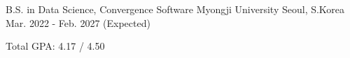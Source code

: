 

\begin{cventries}

  \cventry
    {B.S. in Data Science, Convergence Software} %
    {Myongji University} %
    {Seoul, S.Korea} %
    {Mar. 2022 - Feb. 2027 (Expected)} %
    {
      \begin{cvitems} %
        \item {Total GPA: 4.17 / 4.50}
      \end{cvitems}
    }

\end{cventries}
